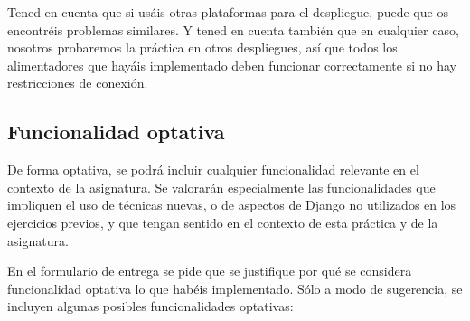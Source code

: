 Tened en cuenta que si usáis otras plataformas para el despliegue, puede que os encontréis problemas similares. Y tened en cuenta también que en cualquier caso, nosotros probaremos la práctica en otros despliegues, así que todos los alimentadores que hayáis implementado deben funcionar correctamente si no hay restricciones de conexión.

\subsection{Funcionalidad optativa}

De forma optativa, se podrá incluir cualquier funcionalidad relevante en el contexto de la asignatura. Se valorarán especialmente las funcionalidades que impliquen el uso de técnicas nuevas, o de aspectos de Django no utilizados en los ejercicios previos, y que tengan sentido en el contexto de esta práctica y de la asignatura.

En el formulario de entrega se pide que se justifique por qué se considera funcionalidad optativa lo que habéis implementado. Sólo a modo de sugerencia, se incluyen algunas posibles funcionalidades optativas:

